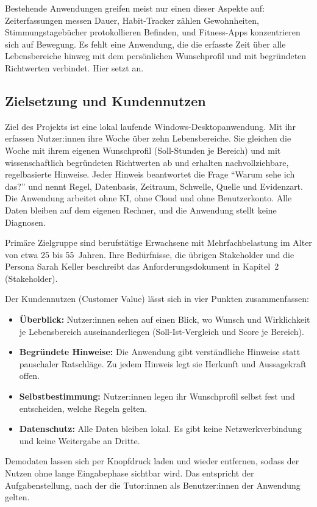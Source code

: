 Bestehende Anwendungen greifen meist nur einen dieser Aspekte auf: Zeiterfassungen messen Dauer, Habit-Tracker zählen Gewohnheiten, Stimmungstagebücher protokollieren Befinden, und Fitness-Apps konzentrieren sich auf Bewegung. Es fehlt eine Anwendung, die die erfasste Zeit über alle Lebensbereiche hinweg mit dem persönlichen Wunschprofil und mit begründeten Richtwerten verbindet. Hier setzt \Projektname{} an.

\subsection{Zielsetzung und Kundennutzen}\label{sec:projektfrage}
Ziel des Projekts ist eine lokal laufende Windows-Desktopanwendung. Mit ihr erfassen Nutzer:innen ihre Woche über zehn Lebensbereiche. Sie gleichen die Woche mit ihrem eigenen Wunschprofil (Soll-Stunden je Bereich) und mit wissenschaftlich begründeten Richtwerten ab und erhalten nachvollziehbare, regelbasierte Hinweise. Jeder Hinweis beantwortet die Frage \enquote{Warum sehe ich das?} und nennt Regel, Datenbasis, Zeitraum, Schwelle, Quelle und Evidenzart. Die Anwendung arbeitet ohne \ac{KI}, ohne Cloud und ohne Benutzerkonto. Alle Daten bleiben auf dem eigenen Rechner, und die Anwendung stellt keine Diagnosen.

Primäre Zielgruppe sind berufstätige Erwachsene mit Mehrfachbelastung im Alter von etwa 25 bis 55~Jahren. Ihre Bedürfnisse, die übrigen Stakeholder und die Persona Sarah Keller beschreibt das Anforderungsdokument in Kapitel~2 (Stakeholder).

Der Kundennutzen (Customer Value) lässt sich in vier Punkten zusammenfassen:
\begin{itemize}
  \item \textbf{Überblick:} Nutzer:innen sehen auf einen Blick, wo Wunsch und Wirklichkeit je Lebensbereich auseinanderliegen (Soll-Ist-Vergleich und Score je Bereich).
  \item \textbf{Begründete Hinweise:} Die Anwendung gibt verständliche Hinweise statt pauschaler Ratschläge. Zu jedem Hinweis legt sie Herkunft und Aussagekraft offen.
  \item \textbf{Selbstbestimmung:} Nutzer:innen legen ihr Wunschprofil selbst fest und entscheiden, welche Regeln gelten.
  \item \textbf{Datenschutz:} Alle Daten bleiben lokal. Es gibt keine Netzwerkverbindung und keine Weitergabe an Dritte.
\end{itemize}
Demodaten lassen sich per Knopfdruck laden und wieder entfernen, sodass der Nutzen ohne lange Eingabephase sichtbar wird. Das entspricht der Aufgabenstellung, nach der die Tutor:innen als Benutzer:innen der Anwendung gelten.

